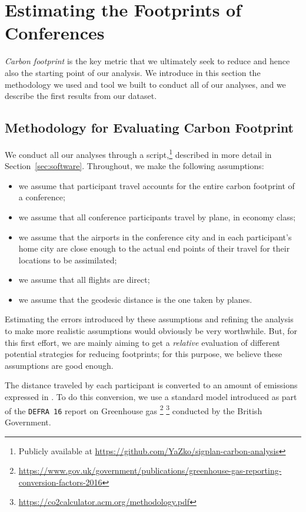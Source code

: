 \section{Estimating the Footprints of Conferences}
\label{sec:footprint}

{\em Carbon footprint} is the key metric that we ultimately seek to reduce
and hence also the starting point of our analysis.  We introduce in this
section the methodology we used and tool we built to conduct all of our
analyses, and we describe the first results from our dataset.

\subsection{Methodology for Evaluating Carbon Footprint}
\label{sec:methodo}

We conduct all our analyses through a \python{} script,\footnote{Publicly available at
  \url{https://github.com/YaZko/sigplan-carbon-analysis}} described in more detail in Section~\ref{sec:software}.
%
Throughout, we make the following assumptions:
\begin{itemize}
\item we assume that participant travel accounts for the entire carbon
footprint of a conference;
\item we assume that {all} conference participants travel by plane, in economy
class;
\item we assume that the airports in the conference city and in each
participant's home city are close enough to the actual end points of their
travel for their locations to be assimilated;
\item we assume that all flights are direct;
\item we assume that the geodesic distance is the one taken by planes.
\end{itemize}
Estimating the errors introduced by these assumptions and refining the
analysis to make more realistic assumptions would obviously be very
worthwhile.
%
But, for this first effort, we are mainly aiming to get a
{\em relative} evaluation of different potential strategies for reducing
footprints; for this purpose, we believe these assumptions are good enough.

The distance traveled by each participant is converted to an amount of
emissions expressed in \gaz. To do this conversion, we use a standard model
introduced as part of the \texttt{DEFRA 16} report on Greenhouse gas
\footnote{\url{https://www.gov.uk/government/publications/greenhouse-gas-reporting-conversion-factors-2016}}
\footnote{\url{https://co2calculator.acm.org/methodology.pdf}} conducted by
the British Government.

